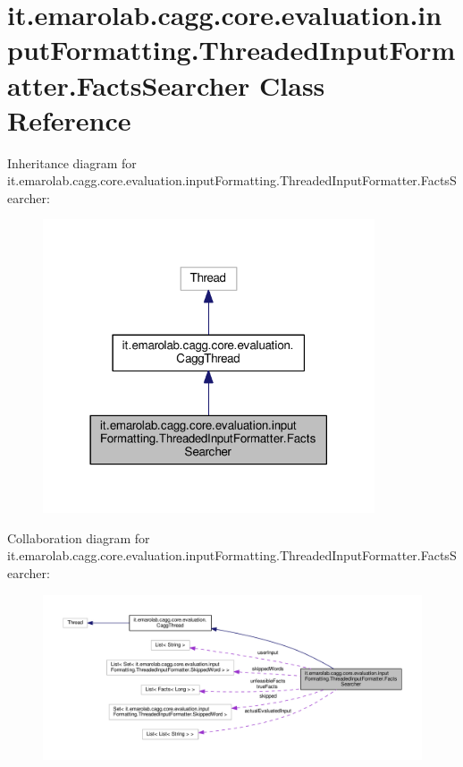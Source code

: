 \hypertarget{classit_1_1emarolab_1_1cagg_1_1core_1_1evaluation_1_1inputFormatting_1_1ThreadedInputFormatter_1_1FactsSearcher}{\section{it.\-emarolab.\-cagg.\-core.\-evaluation.\-input\-Formatting.\-Threaded\-Input\-Formatter.\-Facts\-Searcher Class Reference}
\label{classit_1_1emarolab_1_1cagg_1_1core_1_1evaluation_1_1inputFormatting_1_1ThreadedInputFormatter_1_1FactsSearcher}
}


Inheritance diagram for it.\-emarolab.\-cagg.\-core.\-evaluation.\-input\-Formatting.\-Threaded\-Input\-Formatter.\-Facts\-Searcher\-:\nopagebreak
\begin{figure}[H]
\begin{center}
\leavevmode
\includegraphics[width=278pt]{classit_1_1emarolab_1_1cagg_1_1core_1_1evaluation_1_1inputFormatting_1_1ThreadedInputFormatter_1_1FactsSearcher__inherit__graph}
\end{center}
\end{figure}


Collaboration diagram for it.\-emarolab.\-cagg.\-core.\-evaluation.\-input\-Formatting.\-Threaded\-Input\-Formatter.\-Facts\-Searcher\-:\nopagebreak
\begin{figure}[H]
\begin{center}
\leavevmode
\includegraphics[width=350pt]{classit_1_1emarolab_1_1cagg_1_1core_1_1evaluation_1_1inputFormatting_1_1ThreadedInputFormatter_1_1FactsSearcher__coll__graph}
\end{center}
\end{figure}
